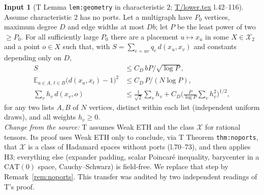 \documentclass[11pt]{article}
\theoremstyle{definition}
\newtheorem{hyp}{Input}
\theoremstyle{remark}
\newcommand{\E}{\mathbb E}
\newcommand{\X}{\mathcal X}
\newcommand{\src}[1]{\url{#1}}
\begin{document}
\begin{hyp}[T Lemma \texttt{lem:geometry} in characteristic $2$; \src{T/lower.tex} l.42--116]\label{H4}
Assume characteristic $2$ has no ports. Let a multigraph have $P_0$ vertices, maximum degree $D$ and edge widths at most $Db$;
let $P$ be the least power of two $\ge P_0$. For all sufficiently large $P_0$ there are a placement $u\mapsto x_u$ in some
$X\in\X_2$ and a point $o\in X$ such that, with $S=\sum_{e=uv}q_e\,d(x_u,x_v)$ and constants depending only on $D$,
\begin{align}
 S &\le C_D\,bP/\sqrt{\log P}, \label{eq:short}\\
 \E_{a\in A,\,t\in B}\bigl(d(x_a,x_t)-1\bigr)^2 &\le C_D\,P/(N\log P), \label{eq:term}\\
 \textstyle\sum_v h_v\,d(x_v,o) &\le \tfrac1{\sqrt2}\textstyle\sum_vh_v+C_D\bigl(\tfrac{P}{\log P}\sum_vh_v^2\bigr)^{1/2}, \label{eq:central}
\end{align}
for any two lists $A,B$ of $N$ vertices, distinct within each list (independent uniform draws), and all weights $h_v\ge0$.\\
\emph{Change from the source:} T assumes Weak ETH and the class $\X$ for rational tensors. Its proof uses Weak ETH only to
conclude, via T Theorem \texttt{thm:noports}, that $\X$ is a class of Hadamard spaces without ports (l.70--73), and then applies
H3; everything else (expander padding, scalar Poincar\'e inequality, barycenter in a $\mathrm{CAT}(0)$ space, Cauchy--Schwarz)
is field-free. We replace that step by Remark~\ref{rem:noports}. This transfer was audited by two independent readings of T's proof.
\end{hyp}
\end{document}
